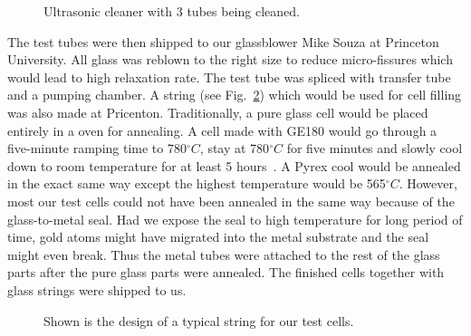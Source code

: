 \begin{figure}[H]
	\centering
	\caption{{Ultrasonic cleaner with 3 tubes being cleaned.}}
	\label{ultrasonic_cleaner}
\end{figure}

The test tubes were then shipped to our glassblower Mike Souza at Princeton University. All glass was reblown to the right size to reduce micro-fissures which would lead to high relaxation rate. The test tube was spliced with transfer tube and a pumping chamber. A string (see Fig.~\ref{string}) which would be used for cell filling was also made at Pricenton. Traditionally, a pure glass cell would be placed entirely in a oven for annealing. A cell made with GE180 would go through a five-minute ramping time to 780$^{\circ}C$, stay at 780$^{\circ}C$ for five minutes and slowly cool down to room temperature for at least 5 hours~\cite{DanThesis}. A Pyrex cool would be annealed in the exact same way except the highest temperature would be 565$^{\circ}C$. However, most our test cells could not have been annealed in the same way because of the glass-to-metal seal. Had we expose the seal to high temperature for long period of time, gold atoms might have migrated into the metal substrate and the seal might even break. Thus the metal tubes were attached to the rest of the glass parts after the pure glass parts were annealed. The finished cells together with glass strings were shipped to us.

\begin{figure}[t!]
	\centering
	\caption{{Shown is the design of a typical string for our test cells.}}
	\label{string}
\end{figure}

